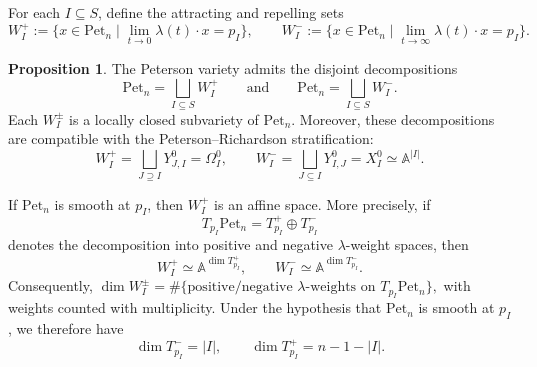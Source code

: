 \documentclass[12pt, reqno]{amsart}
\theoremstyle{plain}
\numberwithin{equation}{section}
\theoremstyle{definition}
\newtheorem{proposition}[theorem]{Proposition}
\begin{document}
For each $I \subseteq S$, define the attracting and repelling sets
\[
W_I^+ := \{x \in \mathrm{Pet}_n \mid \lim_{t \to 0} \lambda(t)\cdot x = p_I\},
\qquad
W_I^- := \{x \in \mathrm{Pet}_n \mid \lim_{t \to \infty} \lambda(t)\cdot x = p_I\}.
\]

\begin{proposition}\label{thm:BB-Peterson}
The Peterson variety admits the disjoint decompositions
\[
\mathrm{Pet}_n
=
\bigsqcup_{I\subseteq S}W_I^+
\qquad\text{and}\qquad
\mathrm{Pet}_n
=
\bigsqcup_{I\subseteq S}W_I^-.
\]
Each \(W_I^\pm\) is a locally closed subvariety of
\(\mathrm{Pet}_n\). Moreover, these decompositions are compatible with
the Peterson--Richardson stratification:
\[
W_I^+
=
\bigsqcup_{J\supseteq I}Y^0_{J,I}
=
\Omega_I^0,
\qquad
W_I^-
=
\bigsqcup_{J\subseteq I}Y^0_{I,J}
=
X_I^0
\simeq
\mathbb A^{|I|}.
\]

If \(\mathrm{Pet}_n\) is smooth at \(p_I\), then \(W_I^+\) is an
affine space. More precisely, if
\[
T_{p_I}\mathrm{Pet}_n
=
T_{p_I}^+\oplus T_{p_I}^-
\]
denotes the decomposition into positive and negative
\(\lambda\)-weight spaces, then
\[
W_I^+
\simeq
\mathbb A^{\dim T_{p_I}^+},
\qquad
W_I^-
\simeq
\mathbb A^{\dim T_{p_I}^-}.
\]
Consequently, $\dim W_I^\pm
=
\#\{
\text{positive/negative \(\lambda\)-weights on }
T_{p_I}\mathrm{Pet}_n
\},$
with weights counted with multiplicity. Under the hypothesis that \(\mathrm{Pet}_n\) is smooth at \(p_I\), we
therefore have
\[
\dim T_{p_I}^- = |I|,
\qquad
\dim T_{p_I}^+ = n-1-|I|.
\] 
\end{proposition}
\end{document}
